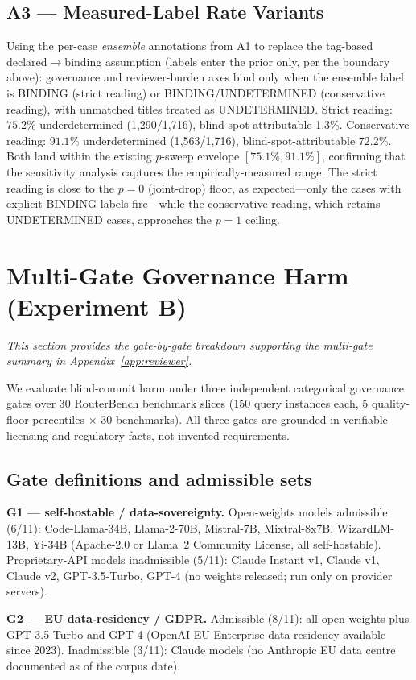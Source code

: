 \documentclass{article} %
\begin{document}
\subsection*{A3 — Measured-Label Rate Variants}
Using the per-case \emph{ensemble} annotations from A1 to replace the tag-based declared$\to$binding assumption (labels enter the prior only, per the boundary above): governance and reviewer-burden axes bind only when the ensemble label is BINDING (strict reading) or BINDING/UNDETERMINED (conservative reading), with unmatched titles treated as UNDETERMINED.
Strict reading: $75.2\%$ underdetermined (1{,}290/1{,}716), blind-spot-attributable 1.3\%.
Conservative reading: $91.1\%$ underdetermined (1{,}563/1{,}716), blind-spot-attributable 72.2\%.
Both land within the existing $p$-sweep envelope $[75.1\%, 91.1\%]$, confirming that the sensitivity analysis captures the empirically-measured range.
The strict reading is close to the $p{=}0$ (joint-drop) floor, as expected---only the cases with explicit BINDING labels fire---while the conservative reading, which retains UNDETERMINED cases, approaches the $p{=}1$ ceiling.

\section{Multi-Gate Governance Harm (Experiment B)}
\label{app:multigate}

\emph{This section provides the gate-by-gate breakdown supporting the multi-gate summary in Appendix~\ref{app:reviewer}.}

We evaluate blind-commit harm under three independent categorical governance gates over 30 RouterBench benchmark slices (150 query instances each, 5 quality-floor percentiles $\times$ 30 benchmarks).
All three gates are grounded in verifiable licensing and regulatory facts, not invented requirements.

\subsection*{Gate definitions and admissible sets}
\textbf{G1 — self-hostable / data-sovereignty.}
Open-weights models admissible (6/11): Code-Llama-34B, Llama-2-70B, Mistral-7B, Mixtral-8x7B, WizardLM-13B, Yi-34B (Apache-2.0 or Llama~2 Community License, all self-hostable).
Proprietary-API models inadmissible (5/11): Claude Instant v1, Claude v1, Claude v2, GPT-3.5-Turbo, GPT-4 (no weights released; run only on provider servers).

\textbf{G2 — EU data-residency / GDPR.}
Admissible (8/11): all open-weights plus GPT-3.5-Turbo and GPT-4 (OpenAI EU Enterprise data-residency available since 2023).
Inadmissible (3/11): Claude models (no Anthropic EU data centre documented as of the corpus date).
\end{document}
